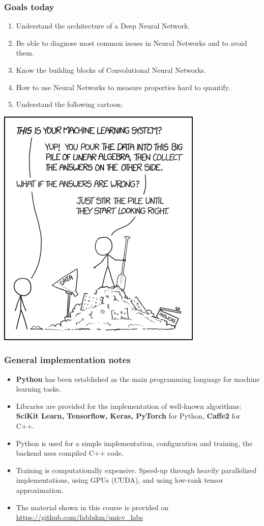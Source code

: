 \documentclass[10pt,hyperref={pdfpagelabels=false}]{beamer}
\begin{document}
\begin{frame}[allowframebreaks]
    \frametitle{Goals today}
        \begin{enumerate}
            \item Understand the architecture of a Deep Neural Network.
            \item Be able to diagnose most common issues in Neural Networks and to avoid them.
            \item Know the building blocks of Convolutional Neural Networks.
            \item How to use Neural Networks to measure properties hard to quantify.
            \framebreak
            \item Understand the following cartoon:
        \end{enumerate}
        \centering\includegraphics[height=.7\textheight]{figures/machine_learning.png}
\end{frame}
\begin{frame}
    \frametitle{General implementation notes}
    \begin{itemize}
        \item {\bf Python} has been established as the main programming language for machine learning tasks.
        \item Libraries are provided for the implementation of well-known algorithms: {\bf SciKit Learn, Tensorflow, Keras, PyTorch} for Python, {\bf Caffe2} for C++.
        \item Python is used for a simple implementation, configuration and training, the backend uses compiled C++ code.
        \item Training is computationally expensive. Speed-up through heavily parallelized implementations, using GPUs (CUDA), and using low-rank tensor approximation.
        \item The material shown in this course is provided on
        \url{https://github.com/fablukm/unicv_labs}
    \end{itemize}
\end{frame}
\end{document}
